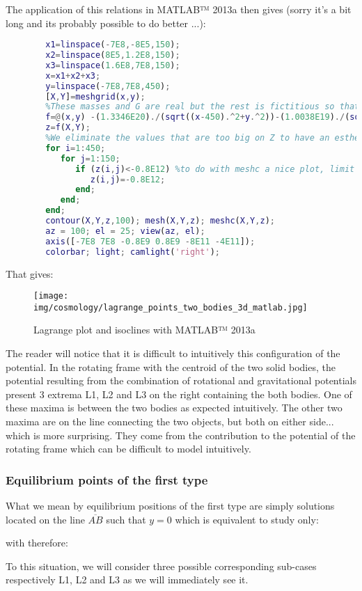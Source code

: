 	The application of this relations in MATLAB™ 2013a then gives (sorry it's a bit long and its probably possible to do better ...):
	\begin{lstlisting}[language=MATLAB]
		%We build the grid plot that we will by anticipation densifiate where are the objects of interest
		x1=linspace(-7E8,-8E5,150);
		x2=linspace(8E5,1.2E8,150);
		x3=linspace(1.6E8,7E8,150);
		x=x1+x2+x3;
		y=linspace(-7E8,7E8,450);
		[X,Y]=meshgrid(x,y);
		%These masses and G are real but the rest is fictitious so that the plot is readable 
		f=@(x,y) -(1.3346E20)./(sqrt((x-450).^2+y.^2))-(1.0038E19)./(sqrt((x-449999550).^2+y.^2))-(6.9E-7.*(x.^2+y.^2));
		z=f(X,Y);
		%We eliminate the values that are too big on Z to have an esthetical result to see
		for i=1:450;
		   for j=1:150;
		      if (z(i,j)<-0.8E12) %to do with meshc a nice plot, limit to  -8E11
		         z(i,j)=-0.8E12;
		      end; 
		   end; 
		end; 
		contour(X,Y,z,100); mesh(X,Y,z); meshc(X,Y,z); 
		az = 100; el = 25; view(az, el);
		axis([-7E8 7E8 -0.8E9 0.8E9 -8E11 -4E11]);
		colorbar; light; camlight('right');
	\end{lstlisting}
	That gives:
	\begin{figure}[H]
		\texttt{[image: img/cosmology/lagrange\_points\_two\_bodies\_3d\_matlab.jpg]}
		\caption{Lagrange plot and isoclines with MATLAB™ 2013a}
	\end{figure}
	The reader will notice that it is difficult to intuitively this configuration of the potential. In the rotating frame with the centroid of the two solid bodies, the potential resulting from the combination of rotational and gravitational potentials present 3 extrema L1, L2 and L3 on the right containing the both bodies. One of these maxima is between the two bodies as expected intuitively. The other two maxima are on the line connecting the two objects, but both on either side... which is more surprising. They come from the contribution to the potential of the rotating frame which can be difficult to model intuitively.
	
	\subsubsection{Equilibrium points of the first type}
	What we mean by equilibrium positions of the first type are simply solutions located on the line $\overline{AB}$ such that $y=0$ which is equivalent to study only:
	
	with therefore:
	
	To this situation, we will consider three possible corresponding sub-cases respectively L1, L2 and L3 as we will immediately see it.
	
